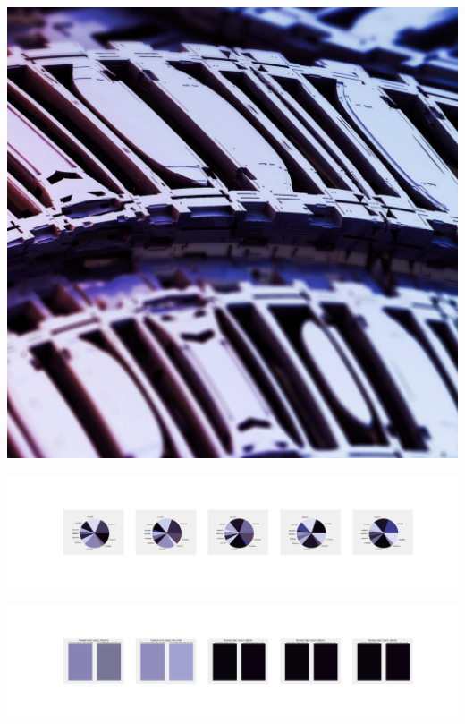 \documentclass[11pt]{article}
\begin{document}
\begin{landscape}
    \begin{center}
    \includegraphics[width=\textwidth]{./nbimg/file (328).jpg}
    \end{center}

    \begin{center}
    \includegraphics[width=250mm]{./nbimg/pie-254.jpg}
    \end{center}

    \begin{center}
    \includegraphics[width=250mm]{./nbimg/peak-254.jpg}
    \end{center}
    


\end{landscape}
\end{document}
